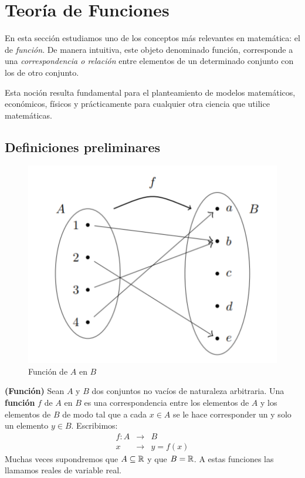 
\section{Teoría de Funciones}

En esta sección estudiamos uno de los conceptos más relevantes en matemática: el de \textit{función}. De manera intuitiva, este objeto denominado función, corresponde a una \textit{correspondencia o relación} entre elementos de un determinado conjunto con los de otro conjunto. 

Esta noción resulta fundamental para el planteamiento de modelos matemáticos, económicos, físicos y prácticamente para cualquier otra ciencia que utilice matemáticas. 

\subsection{Definiciones preliminares}

\begin{figure}[H]
	\begin{center}
	\includegraphics[scale=0.5]{figuras/capitulo1/03-funciones/funcion.png}
		\caption{Función de $A$ en $B$}
	\end{center}
\end{figure}

\begin{definicion}
	\textbf{(Función)}
	Sean $A$ y $B$ dos conjuntos no vacíos de naturaleza arbitraria. Una \textbf{función} $f$ de $A$ en $B$ es una correspondencia entre los elementos de $A$ y los elementos de $B$ de modo tal que a cada $x \in A$ se le hace corresponder un y solo un elemento $y \in B$. Escribimos: 
	\begin{eqnarray*}
		f: A & \longrightarrow & B \\
		x & \longrightarrow & y = f(x) 
	\end{eqnarray*}
	Muchas veces supondremos que $A \subseteq \mathbb{R}$ y que $B = \mathbb{R}$. A estas funciones las llamamos reales de variable real. 
\end{definicion}

